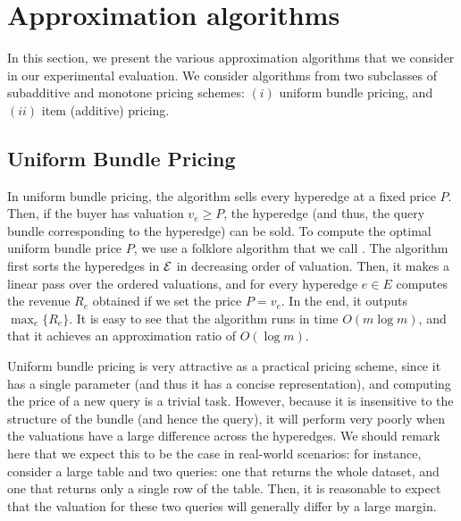 \section{Approximation algorithms}
\label{section-approxalgo}

In this section, we present the various approximation algorithms that we consider in our experimental evaluation. We consider algorithms from two subclasses of subadditive and monotone pricing schemes: $(i)$ uniform bundle pricing, and $(ii)$ item (additive) pricing.

\subsection{Uniform Bundle Pricing} 
\label{subsection-uniformbundle}

In uniform bundle pricing, the algorithm sells every hyperedge at a fixed price $P$. Then, if the buyer has valuation $v_e \geq P$, the hyperedge (and thus, the query bundle corresponding to the hyperedge) can be sold. 
To compute the optimal uniform bundle price $P$, we use a folklore algorithm that we call \ubp . The algorithm first sorts the hyperedges in $\mathcal{E}$
in decreasing order of valuation. Then, it makes a linear pass over the ordered valuations, and for every hyperedge $e \in E$ computes the revenue $R_e$ obtained
if we set the price $P = v_e$. In the end, it outputs $\max_e \{R_e\}$. It is easy to see that the algorithm runs in time $O(m \log m)$, and that it achieves an approximation
ratio of $O(\log m)$.


Uniform bundle pricing is very attractive as a practical pricing scheme, since it has a single parameter (and thus it has a concise representation), and computing the price of a new query is a trivial task. 
However, because it is insensitive to the structure of the bundle (and hence the query), it will perform very poorly when the valuations have a large difference across the hyperedges. 
We should remark here that we expect this to be the case in real-world scenarios: for instance, consider a large table and two queries: one that returns the whole dataset, and one that returns only a single row of the table. Then, it is reasonable to expect that the valuation for these two queries will generally differ by a large margin. 



